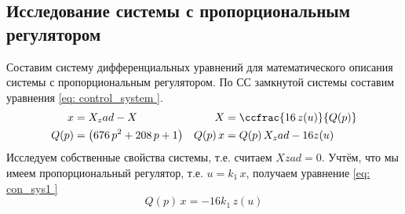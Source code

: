 \subsection{Исследование системы с пропорциональным регулятором}
Составим систему
дифференциальных уравнений для математического описания системы с пропорциональным регулятором.
По СС замкнутой системы составим уравнения \eqref{eq:
control_system
}.
\begin{equation} \label{eq:control_system}
    \begin{aligned}
       x&=X_zad-X & X&=\ccfrac{16\,z(u)}{Q(p)}\\
       Q(p)&=\left(676\,p^2+208\,p+1\right)&Q(p)\,x&=Q(p)\,X_zad-16z(u)\\
    \end{aligned}
\end{equation}
Исследуем собственные свойства системы, т.е. считаем $Xzad=0$.
 Учтём, что мы имеем пропорциональный регулятор, т.е. $u=k_1\,x$, получаем уравнение \eqref{eq:
con_sys1
}
$$Q(p)\,x=-
16
k_1\,z(u)$$
